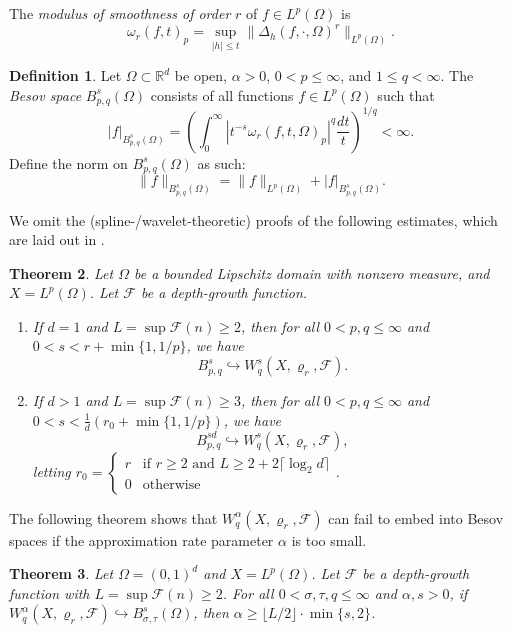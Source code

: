 \documentclass{article}
\newtheorem{theorem}{Theorem}[section]
\theoremstyle{definition}
\newtheorem{definition}[theorem]{Definition}
\theoremstyle{remark}
\begin{document}
The \textit{modulus of smoothness of order} $r$ of $f \in L^p(\Omega)$ is
\[\omega_r(f,t)_p = \sup_{|h| \leq t} \lVert \Delta_h(f,\cdot,\Omega)^r \rVert_{L^p(\Omega)}.\]

\begin{definition}
    \cite[Section 2]{devore_besov_1993} Let $\Omega \subset \mathbb{R}^d$ be open, $\alpha > 0$, $0 < p \leq \infty$, and $1 \leq q < \infty$. The \textit{Besov space} $B_{p,q}^s(\Omega)$ consists of all functions $f \in L^p(\Omega)$ such that
    \[|f|_{B_{p,q}^s(\Omega)} = \left( \int_0^\infty \left| t^{-s}\omega_r(f,t,\Omega)_p \right|^q \frac{dt}{t} \right)^{1/q} < \infty.\]
    Define the norm on $B_{p,q}^s(\Omega)$ as such:
    \[\lVert f \rVert_{B_{p,q}^s(\Omega)} = \lVert f \rVert_{L^p(\Omega)} + |f|_{B_{p,q}^s(\Omega)}.\]
\end{definition}

We omit the (spline-/wavelet-theoretic) proofs of the following estimates, which are laid out in \cite{gribonval_approximation_2022}.

\begin{theorem}
    Let $\Omega$ be a bounded Lipschitz domain with nonzero measure, and $X = L^p(\Omega)$. Let $\mathcal{F}$ be a depth-growth function.
    \begin{enumerate}
        \item If $d = 1$ and $L = \sup \mathcal{F}(n) \geq 2$, then for all $0 < p,q \leq \infty$ and $0 < s < r + \min \{ 1,1/p \}$, we have
        \[B_{p,q}^s \hookrightarrow W_q^s(X,\varrho_r,\mathcal{F}).\]
        \item If $d > 1$ and $L = \sup \mathcal{F}(n) \geq 3$, then for all $0 < p,q \leq \infty$ and $0 < s < \frac{1}{d}(r_0 + \min \{ 1,1/p \})$, we have
        \[B_{p,q}^{sd} \hookrightarrow W_q^s(X,\varrho_r,\mathcal{F}),\]
        letting $r_0 = \begin{cases}
            r & \text{if } r \geq 2 \text{ and } L \geq 2 + 2\lceil \log_2 d \rceil \\
            0 & \text{otherwise}
        \end{cases}$.
    \end{enumerate}
\end{theorem}

The following theorem shows that $W_q^\alpha(X,\varrho_r,\mathcal{F})$ can fail to embed into Besov spaces if the approximation rate parameter $\alpha$ is too small.

\begin{theorem}
    Let $\Omega = (0,1)^d$ and $X = L^p(\Omega)$. Let $\mathcal{F}$ be a depth-growth function with $L = \sup \mathcal{F}(n) \geq 2$. For all $0 < \sigma,\tau,q \leq \infty$ and $\alpha,s > 0$, if $W_q^\alpha(X,\varrho_r,\mathcal{F}) \hookrightarrow B_{\sigma,\tau}^s(\Omega)$, then $\alpha \geq \lfloor L/2 \rfloor \cdot \min \{ s,2 \}$.
\end{theorem}
\end{document}
